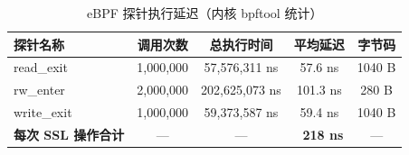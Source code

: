 \documentclass[11pt]{ctexart}
\begin{document}
\thispagestyle{empty}
\begin{table}[H]
\centering
\caption{eBPF 探针执行延迟（内核 bpftool 统计）}
\small
\begin{tabular}{lcccc}
\toprule
\textbf{探针名称} & \textbf{调用次数} & \textbf{总执行时间} & \textbf{平均延迟} & \textbf{字节码} \\
\midrule
read_exit & 1,000,000 & 57,576,311 ns & 57.6 ns & 1040 B \\
rw_enter & 2,000,000 & 202,625,073 ns & 101.3 ns & 280 B \\
write_exit & 1,000,000 & 59,373,587 ns & 59.4 ns & 1040 B \\
\textbf{每次 SSL 操作合计} & — & — & \textbf{~218 ns} & — \\
\bottomrule
\end{tabular}
\end{table}
\end{document}
